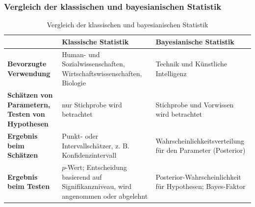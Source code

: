 \documentclass[a4paper,12pt]{article}
\begin{document}
\subsubsection{Vergleich der klassischen und bayesianischen Statistik}

\begin{table}[h!]
  \centering
  \begin{tabular}{|p{3cm}|p{5cm}|p{6cm}|}
    \hline
    \textbf{} & \textbf{Klassische Statistik} & \textbf{Bayesianische Statistik} \\ \hline
    \textbf{Bevorzugte Verwendung} & Human- und Sozialwissenschaften, Wirtschaftswissenschaften, Biologie & Technik und Künstliche Intelligenz \\ 
    \hline
    \textbf{Schätzen von Parametern, Testen von Hypothesen} & nur Stichprobe wird betrachtet & Stichprobe und Vorwissen wird betrachtet \\
    \hline
    \textbf{Ergebnis beim Schätzen} & Punkt- oder Intervallschätzer, z. B. Konfidenzintervall & Wahrscheinlichkeitsverteilung für den Parameter (Posterior) 
    \\ \hline
  \textbf{Ergebnis beim Testen} & \(p\)-Wert; Entscheidung basierend auf Signifikanzniveau, wird angenommen oder abgelehnt & Posterior-Wahrscheinlichkeit für Hypothesen; Bayes-Faktor \\ 
  \hline
  \end{tabular}
  \caption{Vergleich der klassischen und bayesianischen Statistik}
  \label{tab:vergleich_verwendung}
\end{table}
\end{document}
